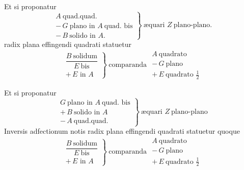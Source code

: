 \documentclass[11pt,a4paper]{article}
\begin{document}
Et si proponatur
\[ \left.\begin{array}{l} A\ \text{quad.quad.} \\ -\,G\ \text{plano in } A\ \text{quad. bis} \\ -\,B\ \text{solido in } A. \end{array}\right\}\ \text{æquari } Z\ \text{plano-plano.} \]
radix plana effingendi quadrati statuetur
\[ \left.\begin{array}{l} \dfrac{B\ \text{solidum}}{E\ \text{bis}} \\ +\,E \text{ in } A \end{array}\right\}\ \text{comparanda } \begin{array}{l} A\ \text{quadrato} \\ -\,G\ \text{plano} \\ +\,E\ \text{quadrato } \frac{1}{2} \end{array} \]

Et si proponatur
\[ \left.\begin{array}{l} G\ \text{plano in } A\ \text{quad. bis} \\ +\,B\ \text{solido in } A \\ -\,A\ \text{quad.quad.} \end{array}\right\}\ \text{æquari } Z\ \text{plano-plano} \]
Inversis adfectionum notis radix plana effingendi quadrati statuetur quoque
\[ \left.\begin{array}{l} \dfrac{B\ \text{solidum}}{E\ \text{bis}} \\ +\,E \text{ in } A \end{array}\right\}\ \text{comparanda } \begin{array}{l} A\ \text{quadrato} \\ -\,G\ \text{plano} \\ +\,E\ \text{quadrato } \frac{1}{2} \end{array} \]
\end{document}
